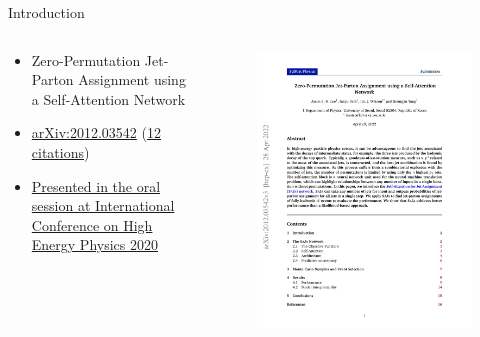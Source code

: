 \makeatletter
  \graphicspath{ {@path} }
\makeatother

\begin{frame}[fragile]{Introduction}
  \begin{columns}

    \begin{column}{0.5\textwidth}
      \begin{itemize}
        \item Zero-Permutation Jet-Parton Assignment using a Self-Attention Network
        \item \href{https://doi.org/10.48550/arXiv.2012.03542}{arXiv:2012.03542} (\href{https://inspirehep.net/literature/1835305}{12 citations})
        \item \href{https://pos.sissa.it/390/348}{Presented in the oral session at International Conference on High Energy Physics 2020}
      \end{itemize}
    \end{column}

    \begin{column}{0.5\textwidth}
      \begin{figure}[htpb]
        \centering
        \includegraphics[height=0.48\textheight]{fig/publication/2012.03542.pdf}
      \end{figure}
      
    \end{column}

  \end{columns}
\end{frame}


